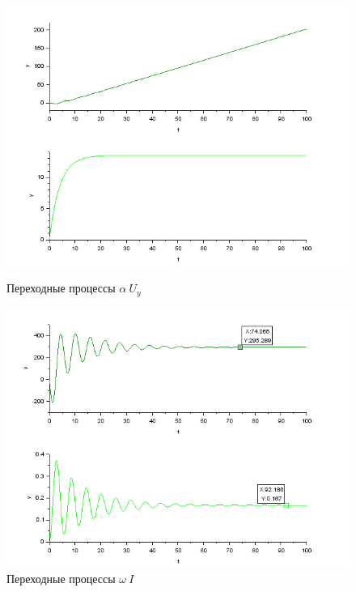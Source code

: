 \documentclass[a4paper,12pt,russian]{article} %
\begin{document}
\begin{figure}[H]
	\includegraphics[width=\linewidth]{531.png}
	\caption{Переходные процессы $\alpha\:  U_y$}\label{p531}
	\endminipage\hfill
	\includegraphics[width=\linewidth]{532.png}
	\caption{Переходные процессы $\omega\:  I$}\label{p532}
	\endminipage
\end{figure}
\end{document}

